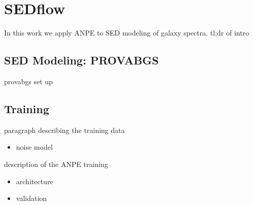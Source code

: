 \section{SEDflow} \label{sec:sedflow}
In this work we apply ANPE to SED modeling of galaxy spectra. 
tl;dr of intro 

\subsection{SED Modeling: PROVABGS} \label{sec:provabgs}

provabgs set up 

\subsection{Training} \label{sec:training}
paragraph describing the training data
\begin{itemize}
    \item noise model 
\end{itemize}

description of the ANPE training
\begin{itemize}
    \item architecture
    \item validation 
\end{itemize}


